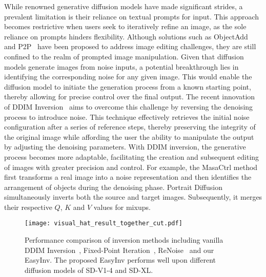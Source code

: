 \documentclass[letterpaper]{article} \usepackage{aaai25}  \usepackage{times}  \usepackage{helvet}  \usepackage{courier}  \usepackage[hyphens]{url}  \usepackage{graphicx} \urlstyle{rm} \def\UrlFont{\rm}  \usepackage{natbib}  \usepackage{caption} \frenchspacing  \setlength{\pdfpagewidth}{8.5in} \setlength{\pdfpageheight}{11in} \usepackage{algorithm}
\begin{document}
While renowned generative diffusion models have made significant strides, a prevalent limitation is their reliance on textual prompts for input.
This approach becomes restrictive when users seek to iteratively refine an image, as the sole reliance on prompts hinders flexibility.
Although solutions such as ObjectAdd~\cite{zhang2024objectadd} and P2P~\cite{hertz2022prompt} have been proposed to address image editing challenges, they are still confined to the realm of prompted image manipulation.
Given that diffusion models generate images from noise inputs, a potential breakthrough lies in identifying the corresponding noise for any given image.
This would enable the diffusion model to initiate the generation process from a known starting point, thereby allowing for precise control over the final output.
The recent innovation of DDIM Inversion~\cite{couairon2023diffedit} aims to overcome this challenge by reversing the denoising process to introduce noise.
This technique effectively retrieves the initial noise configuration after a series of reference steps, thereby preserving the integrity of the original image while affording the user the ability to manipulate the output by adjusting the denoising parameters.
With DDIM inversion, the generative process becomes more adaptable, facilitating the creation and subsequent editing of images with greater precision and control.
For example, the MasaCtrl method~\cite{cao_2023_masactrl} first transforms a real image into a noise representation and then identifies the arrangement of objects during the denoising phase.
Portrait Diffusion\cite{liu2023portrait} simultaneously inverts both the source and target images. Subsequently, it merges their respective $Q$, $K$ and $V$ values for mixups.


\begin{figure}
  \centering
  \texttt{[image: visual\_hat\_result\_together\_cut.pdf]}
  \caption{Performance comparison of inversion methods including vanilla DDIM Inversion~\cite{couairon2023diffedit}, Fixed-Point Iteration~\cite{pan2023effective}, ReNoise~\cite{garibi2024renoise} and our EasyInv. The proposed EasyInv performs well upon different diffusion models of SD-V1-4 and SD-XL.}
  \label{fig_inver}
\end{figure}
\end{document}
